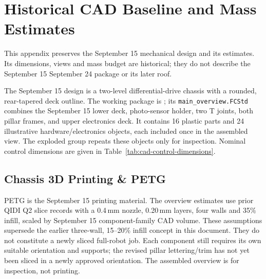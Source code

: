 \clearpage
\section{Historical CAD Baseline and Mass Estimates}
\label{app:historical-cad}
This appendix preserves the September 15 mechanical design and its estimates. Its dimensions, views and mass budget are historical; they do not describe the September 15 September 24 package or its later roof.

The September 15 design is a two-level differential-drive chassis with a rounded, rear-tapered deck outline. The working package is ; its \texttt{main\_overview.FCStd} combines the September 15 lower deck, photo-sensor holder, two T joints, both pillar frames, and upper electronics deck. It contains 16 plastic parts and 24 illustrative hardware/electronics objects, each included once in the assembled view. The exploded group repeats these objects only for inspection. Nominal control dimensions are given in Table~\ref{tab:cad-control-dimensions}.

\subsection{Chassis 3D Printing \& PETG}
PETG is the September 15 printing material. The overview estimates use prior QIDI Q2 slice records with a 0.4\,mm nozzle, 0.20\,mm layers, four walls and 35\% infill, scaled by September 15 component-family CAD volume. These assumptions supersede the earlier three-wall, 15--20\% infill concept in this document. They do not constitute a newly sliced full-robot job. Each component still requires its own suitable orientation and supports; the revised pillar lettering/trim has not yet been sliced in a newly approved orientation. The assembled overview is for inspection, not printing.

